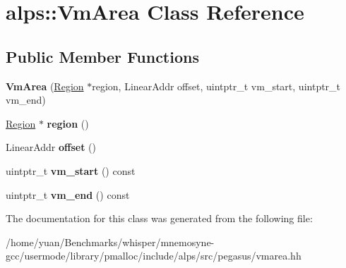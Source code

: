 \hypertarget{classalps_1_1VmArea}{}\section{alps\+:\+:Vm\+Area Class Reference}
\label{classalps_1_1VmArea}
\subsection*{Public Member Functions}
\begin{DoxyCompactItemize}
\item 
{\bfseries Vm\+Area} (\hyperlink{classalps_1_1Region}{Region} $\ast$region, Linear\+Addr offset, uintptr\+\_\+t vm\+\_\+start, uintptr\+\_\+t vm\+\_\+end)\hypertarget{classalps_1_1VmArea_a1c10dd7c7fa77d7f89455775420915b8}{}\label{classalps_1_1VmArea_a1c10dd7c7fa77d7f89455775420915b8}

\item 
\hyperlink{classalps_1_1Region}{Region} $\ast$ {\bfseries region} ()\hypertarget{classalps_1_1VmArea_a267dd6fa1cbcd93441800bfbf3ea7717}{}\label{classalps_1_1VmArea_a267dd6fa1cbcd93441800bfbf3ea7717}

\item 
Linear\+Addr {\bfseries offset} ()\hypertarget{classalps_1_1VmArea_addfcaca3c4806141d50255b8986248ef}{}\label{classalps_1_1VmArea_addfcaca3c4806141d50255b8986248ef}

\item 
uintptr\+\_\+t {\bfseries vm\+\_\+start} () const \hypertarget{classalps_1_1VmArea_a0895be6daf2a547bcc3fd3eeae15e709}{}\label{classalps_1_1VmArea_a0895be6daf2a547bcc3fd3eeae15e709}

\item 
uintptr\+\_\+t {\bfseries vm\+\_\+end} () const \hypertarget{classalps_1_1VmArea_a069924fdab535b7c25a3b4685d7fe233}{}\label{classalps_1_1VmArea_a069924fdab535b7c25a3b4685d7fe233}

\end{DoxyCompactItemize}


The documentation for this class was generated from the following file\+:\begin{DoxyCompactItemize}
\item 
/home/yuan/\+Benchmarks/whisper/mnemosyne-\/gcc/usermode/library/pmalloc/include/alps/src/pegasus/vmarea.\+hh\end{DoxyCompactItemize}
